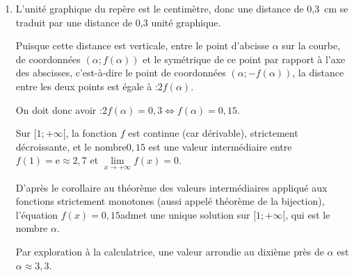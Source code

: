 \documentclass[10pt]{article}
\providecommand{\R}{\mathbb{R}}
\providecommand{\e}{{\mathrm{e}}}
\providecommand{\np}[2][]{{#2~#1}}
\begin{document}
\begin{enumerate}
\begin{enumerate}
			\item La fonction exponentielle est à valeurs strictement positives, donc $f'(x)$ est du même signe que l'expression affine $(-4x + 4)$, décroissante sur $\R$ et s'annulant pour $x = 1$.

			On en déduit que $f$ changera de variation en $x = 1$.

			Calculons : \quad $f(0) = (2\times 0 -1)\e^{-2\times 0 +3} = -\e^{3}$,\quad $f(1) = (2\times 1 - 1)\e^{-2\times 1+3} = \e$.

			On peut donc construire le tableau de variations complet de la fonction $f$ :

			\begin{center}
			\end{center}
		\end{enumerate}

		\item L'unité graphique du repère est le centimètre, donc une distance de \np[cm]{0,3} se traduit par une distance de 0,3 unité graphique.

		Puisque cette distance est verticale, entre le point d'abcisse $\alpha$ sur la courbe, de coordonnées $(\alpha ; f(\alpha))$ et le symétrique de ce point par rapport à l'axe des abscisses, c'est-à-dire le point de coordonnées $(\alpha ; -f(\alpha))$, la distance entre les deux points est égale à :\quad $2f(\alpha)$.

		On doit donc avoir :\quad $2f(\alpha) = 0,3 \iff f(\alpha) = 0,15$.

		Sur $[1 ; + \infty[$, la fonction $f$ est continue (car dérivable), strictement décroissante, et le nombre$ 0,15$ est une valeur intermédiaire entre $f(1) = \e \approx 2,7$ et $\lim\limits_{x \to +\infty} f(x)=0$.

		D'après le corollaire au théorème des valeurs intermédiaires appliqué aux fonctions strictement monotones (aussi appelé théorème de la bijection), l'équation \quad $f(x) = 0,15$\quad admet une unique solution sur $[1 ; +\infty[$, qui est le nombre $\alpha$.

		Par exploration à la calculatrice, une valeur arrondie au dixième près de $\alpha$ est $\alpha \approx 3,3$.
	\end{enumerate}
\end{document}
